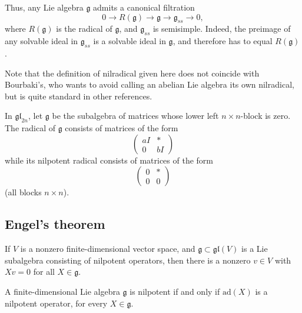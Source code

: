 Thus, any Lie algebra $\mathfrak g$ admits a canonical filtration
\begin{equation}
 \label{equation-filtration-solvable-semisimple}
0 \to R(\mathfrak g) \to \mathfrak g \to \mathfrak g_{ss} \to 0,
\end{equation}
where $R(\mathfrak g)$ is the radical of $\mathfrak g$, and $\mathfrak g_{ss}$ is semisimple. Indeed, the preimage of any solvable ideal in $\mathfrak g_{ss}$ is a solvable ideal in $\mathfrak g$, and therefore has to equal $R(\mathfrak g)$.


Note that the definition of nilradical given here does not coincide with Bourbaki's, who wants to avoid calling an abelian Lie algebra its own nilradical, but is quite standard in other references.

\begin{example}
 \label{example-radical}
 In $\mathfrak{gl}_{2n}$, let $\mathfrak g$ be the subalgebra of matrices whose lower left $n\times n$-block is zero. The radical of $\mathfrak g$ consists of matrices of the form
 $$ \begin{pmatrix}
     aI & * \\ 0 & bI
    \end{pmatrix}$$
 while its nilpotent radical consists of matrices of the form 
 $$ \begin{pmatrix}
     0 & * \\ 0 & 0
    \end{pmatrix}$$
 (all blocks $n\times n$).  

\end{example}

\subsection{Engel's theorem}
\label{subsection-Engel-theorem}

\begin{theorem}
 \label{theorem-Engel}
If $V$ is a nonzero finite-dimensional vector space, and $\mathfrak g\subset \mathfrak{gl}(V)$ is a Lie subalgebra consisting of nilpotent operators, then there is a nonzero $v\in V$ with $Xv = 0$ for all $X\in \mathfrak g$.
 
A finite-dimensional Lie algebra $\mathfrak g$ is nilpotent if and only if $\text{ad}(X)$ is a nilpotent operator, for every $X\in \mathfrak g$. 
\end{theorem}

